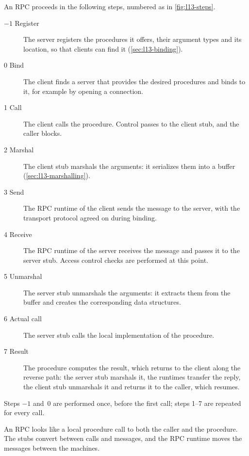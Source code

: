 \documentclass[../main.tex]{subfiles}
\begin{document}
An RPC proceeds in the following steps, numbered as in
\cref{fig:l13-steps}.
\begin{description}
  \item[$-1$ Register] The server registers the procedures it offers, their
    argument types and its location, so that clients can find it
    (\cref{sec:l13-binding}).
  \item[0 Bind] The client finds a server that provides the desired
    procedures and binds to it, for example by opening a connection.
  \item[1 Call] The client calls the procedure.  Control passes to the
    client stub, and the caller blocks.
  \item[2 Marshal] The client stub marshals the arguments: it serializes
    them into a buffer (\cref{sec:l13-marshalling}).
  \item[3 Send] The RPC runtime of the client sends the message to the
    server, with the transport protocol agreed on during binding.
  \item[4 Receive] The RPC runtime of the server receives the message and
    passes it to the server stub.  Access control checks are performed at
    this point.
  \item[5 Unmarshal] The server stub unmarshals the arguments: it extracts
    them from the buffer and creates the corresponding data structures.
  \item[6 Actual call] The server stub calls the local implementation of the
    procedure.
  \item[7 Result] The procedure computes the result, which returns to the
    client along the reverse path: the server stub marshals it, the
    runtimes transfer the reply, the client stub unmarshals it and returns
    it to the caller, which resumes.
\end{description}
Steps $-1$ and~0 are performed once, before the first call; steps 1--7 are
repeated for every call.

\begin{keypoint}
  An RPC looks like a local procedure call to both the caller and the
  procedure.  The stubs convert between calls and messages, and the RPC
  runtime moves the messages between the machines.
\end{keypoint}
\end{document}
